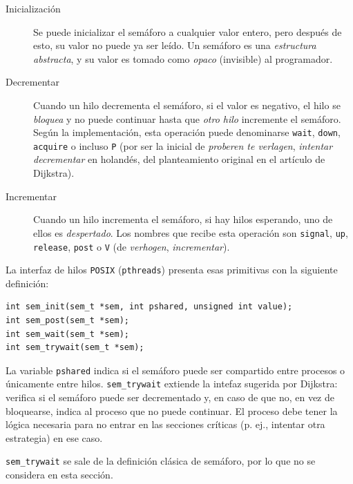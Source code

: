 \documentclass[11pt,fleqn]{book} %
\begin{document}
\begin{description}
\item[Inicialización] Se puede inicializar el semáforo a cualquier valor
                    entero, pero después de esto, su valor no puede ya
                    ser leído. Un semáforo es una \emph{estructura                     abstracta}, y su valor es tomado como \emph{opaco}
                    (invisible) al programador.
\item[Decrementar] Cuando un hilo decrementa el semáforo, si el valor es
                 negativo, el hilo se \emph{bloquea} y no puede continuar
                 hasta que \emph{otro hilo} incremente el semáforo. Según
                 la implementación, esta operación puede denominarse
                 \texttt{wait}, \texttt{down}, \texttt{acquire} o incluso \texttt{P} (por ser la
                 inicial de \emph{proberen te verlagen}, \emph{intentar                  decrementar} en holandés, del planteamiento original
                 en el artículo de Dijkstra).
\item[Incrementar] Cuando un hilo incrementa el semáforo, si hay hilos
                 esperando, uno de ellos es \emph{despertado}. Los nombres
                 que recibe esta operación son \texttt{signal}, \texttt{up},
                 \texttt{release}, \texttt{post} o \texttt{V} (de \emph{verhogen},
                 \emph{incrementar}).
\end{description}

La interfaz de hilos \texttt{POSIX} (\texttt{pthreads}) presenta esas primitivas
con la siguiente definición:


\begin{verbatim}
int sem_init(sem_t *sem, int pshared, unsigned int value);
int sem_post(sem_t *sem);
int sem_wait(sem_t *sem);
int sem_trywait(sem_t *sem);
\end{verbatim}

La variable \texttt{pshared} indica si el semáforo puede ser compartido
entre procesos o únicamente entre hilos. \texttt{sem\_trywait} extiende la
intefaz sugerida por Dijkstra: verifica si el semáforo puede ser
decrementado y, en caso de que no, en vez de bloquearse, indica al
proceso que no puede continuar. El proceso debe tener la lógica
necesaria para no entrar en las secciones críticas (p. ej., intentar
otra estrategia) en ese caso.

\texttt{sem\_trywait} se sale de la definición clásica de semáforo, por lo
que no se considera en esta sección.
\end{document}
